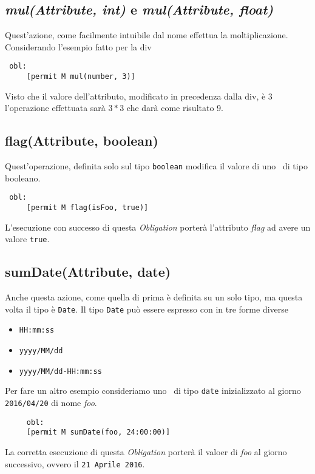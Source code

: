 \subsection*{\textit{mul(Attribute, int)} e \textit{mul(Attribute, float)}} %
\label{ssub:opdiv}
Quest'azione, come facilmente intuibile dal nome effettua la moltiplicazione.
Considerando l'esempio fatto per la div
\begin{verbatim}
 obl:
     [permit M mul(number, 3)]
\end{verbatim}
Visto che il valore dell'attributo, modificato in precedenza dalla div, è 3 l'operazione effettuata sarà $3*3$ che darà come risultato 9.



\subsection*{flag(Attribute, boolean)} %
\label{ssub:opflag}
Quest'operazione, definita solo sul tipo \texttt{boolean} modifica il valore di uno \statusattribute \ di tipo booleano.
\begin{verbatim}
 obl:
     [permit M flag(isFoo, true)]
\end{verbatim}
L'esecuzione con successo di questa \textit{Obligation} porterà l'attributo \textit{flag} ad avere un valore \texttt{true}.

\subsection*{sumDate(Attribute, date)}
\label{ssub:opdate}

Anche questa azione, come quella di prima è definita su un solo tipo, ma questa volta il tipo è \texttt{Date}. Il tipo \texttt{Date} può essere espresso con in tre forme diverse
\begin{itemize}
\item{\texttt{HH:mm:ss}}
\item{\texttt{yyyy/MM/dd}}
\item{\texttt{yyyy/MM/dd-HH:mm:ss}}
\end{itemize}
Per fare un altro esempio consideriamo uno \statusattribute \ di tipo \texttt{date} inizializzato al giorno \texttt{2016/04/20} di nome \textit{foo}.
\begin{verbatim}
	 obl:
     [permit M sumDate(foo, 24:00:00)]
\end{verbatim}
La corretta esecuzione di questa \textit{Obligation} porterà il valoer di \textit{foo} al giorno successivo, ovvero il \texttt{21 Aprile 2016}.

